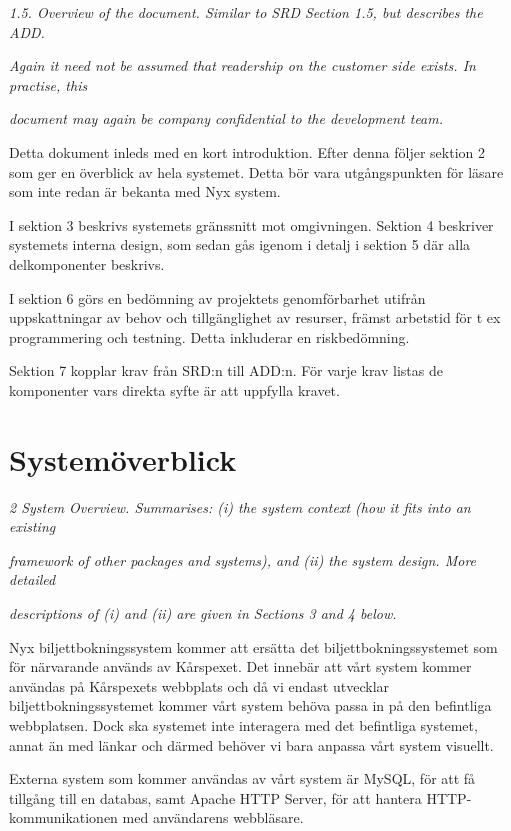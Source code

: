 \documentclass[a4paper, twoside, 11pt, titlepage]{article}
\begin{document}
	\emph{1.5. Overview of the document. Similar to SRD Section 1.5, but describes the ADD.}

	\emph{Again it need not be assumed that readership on the customer side exists. In practise, this}

	\emph{document may again be company confidential to the development team.}

	Detta dokument inleds med en kort introduktion. Efter denna följer sektion 2 som ger en överblick av hela systemet. Detta bör vara utgångspunkten för läsare som inte redan är bekanta med Nyx system.

	I sektion 3 beskrivs systemets gränssnitt mot omgivningen. Sektion 4 beskriver systemets interna design, som sedan gås igenom i detalj i sektion 5 där alla delkomponenter beskrivs.

	I sektion 6 görs en bedömning av projektets genomförbarhet utifrån uppskattningar av behov och tillgänglighet av resurser, främst arbetstid för t ex programmering och testning. Detta inkluderar en riskbedömning.

	Sektion 7 kopplar krav från SRD:n till ADD:n. För varje krav listas de komponenter vars direkta syfte är att uppfylla kravet.

\clearpage
\section{Systemöverblick}


\emph{2 System Overview. Summarises: (i) the system context (how it fits into an existing}

\emph{framework of other packages and systems), and (ii) the system design. More detailed}

\emph{descriptions of (i) and (ii) are given in Sections 3 and 4 below.}

Nyx biljettbokningssystem kommer att ersätta det biljettbokningssystemet som för närvarande används av Kårspexet. Det innebär att vårt system kommer användas på Kårspexets webbplats och då vi endast utvecklar biljettbokningssystemet kommer vårt system behöva passa in på den befintliga webbplatsen. Dock ska systemet inte interagera med det befintliga systemet, annat än med länkar och därmed behöver vi bara anpassa vårt system visuellt.

Externa system som kommer användas av vårt system är MySQL, för att få tillgång till en databas, samt Apache HTTP Server, för att hantera HTTP-kommunikationen med användarens webbläsare. 
\end{document}
